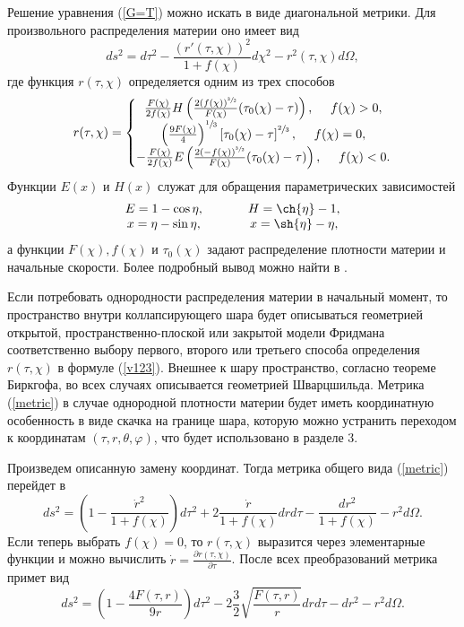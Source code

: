 \documentclass[12pt]{article}
\newcommand{\bq}{\begin{equation}}
\newcommand{\eq}{\end{equation}}
\begin{document}
Решение уравнения (\ref{G=T}) можно искать в виде диагональной метрики. Для произвольного распределения материи оно имеет вид
\bq
\label{metric}
	d s^2 = d \tau^2 - \frac{(r'(\tau, \chi))^2}{1+f(\chi)} d\chi^2 - r^2(\tau, \chi) d \Omega,
\eq
где функция $r(\tau, \chi)$ определяется одним из трех способов
\bq
\label{v123}
	r(\tau, \chi) = \left\{
	\begin{matrix}
	\frac{F(\chi)}{2 f(\chi)} H \left( \frac{2(f(\chi))^{\sfrac{3}{2}} }{F(\chi)}(\tau_0(\chi)-\tau)  \right) , \ \ \ \ f(\chi) > 0,\\
	\left( \frac{9F(\chi)}{4} \right)^{\sfrac{1}{3}} \left[ \tau_0(\chi)- \tau \right]^{\sfrac{2}{3}}, \ \ \ \ f(\chi) = 0, \\
	- \frac{F(\chi)}{2 f(\chi)} E \left( \frac{2(-f(\chi))^{\sfrac{3}{2}} }{F(\chi)}(\tau_0(\chi)-\tau) \right), \ \ \ \ f(\chi) < 0.  
	\end{matrix} \right.
\eq
Функции $E(x)$ и $H(x)$  служат для обращения параметрических зависимостей
\bq
	\begin{array}{c}
	E = 1 - \cos{\eta}, \\
	x = \eta - \sin{\eta},
	\end{array} \ \ \ \ \ \ \ \
	\begin{array}{c}
	H = \ch{\eta}-1, \\
	x = \sh{\eta} - \eta,
	\end{array}
\eq
а функции $F(\chi), f(\chi)$ и $\tau_0(\chi)$ задают распределение плотности материи и начальные скорости. Более подробный вывод можно найти в \cite{landavshic2}.

Если потребовать однородности распределения материи в начальный момент, то пространство внутри коллапсирующего шара будет описываться геометрией открытой, пространственно-плоской или закрытой модели Фридмана соответственно выбору первого, второго или третьего способа определения $r(\tau, \chi)$ в формуле (\ref{v123}). Внешнее к шару пространство, согласно теореме Биркгофа, во всех случаях описывается геометрией Шварцшильда. Метрика (\ref{metric}) в случае однородной плотности материи будет иметь координатную особенность в виде скачка на границе шара, которую можно устранить переходом к координатам $(\tau, r, \theta, \varphi)$, что будет использовано в разделе 3. 

Произведем описанную замену координат. Тогда метрика общего вида (\ref{metric}) перейдет в 
\bq
	d s^2 = \left( 1- \frac{\dot{r}^2}{1+f(\chi)}\right) d \tau^2 + 2\frac{\dot{r}}{1+f(\chi)}dr d\tau - \frac{dr^2}{1+f(\chi)} - r^2 d\Omega.
\eq
Если теперь выбрать $f(\chi)=0$, то $r(\tau, \chi)$ выразится через элементарные функции и можно вычислить $\dot{r} = \frac{\partial r(\tau, \chi)}{\partial \tau}$. После всех преобразований метрика примет вид
\bq
\label{metric2}
	d s^2 = \left(1-\frac{4F(\tau, r)}{9 r} \right)d\tau^2 - 2 \frac{3}{2}\sqrt{\frac{F(\tau, r)}{r}}dr d\tau  - dr^2 - r^2 d\Omega.
\eq
\end{document}
